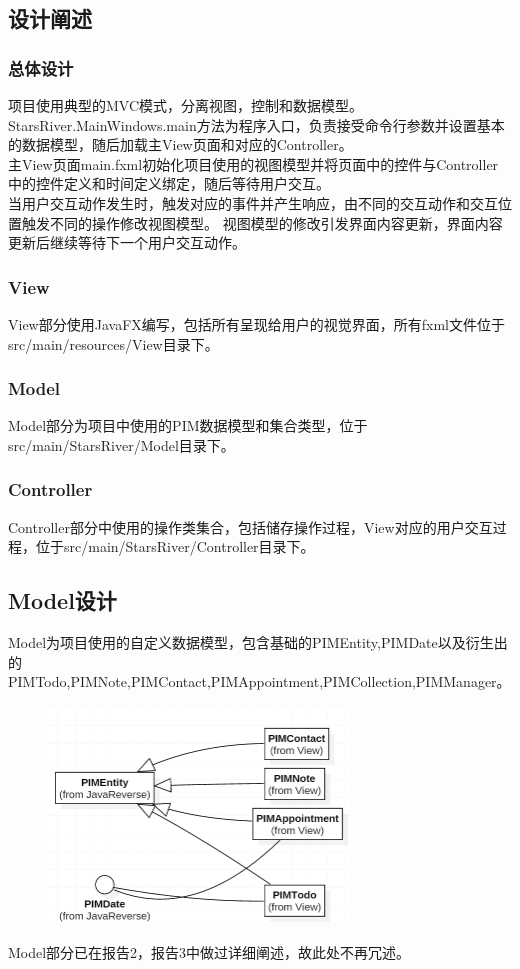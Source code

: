 \documentclass[a4paper]{article}
\begin{document}
\subsection{设计阐述}
    \subsubsection{总体设计}
        项目使用典型的MVC模式，分离视图，控制和数据模型。\\
        StarsRiver.MainWindows.main方法为程序入口，负责接受命令行参数并设置基本的数据模型，随后加载主View页面和对应的Controller。\\
        主View页面main.fxml初始化项目使用的视图模型并将页面中的控件与Controller中的控件定义和时间定义绑定，随后等待用户交互。\\
        当用户交互动作发生时，触发对应的事件并产生响应，由不同的交互动作和交互位置触发不同的操作修改视图模型。
        视图模型的修改引发界面内容更新，界面内容更新后继续等待下一个用户交互动作。
    \subsubsection{View}
        View部分使用JavaFX编写，包括所有呈现给用户的视觉界面，所有fxml文件位于src/main/resources/View目录下。\\
    \subsubsection{Model}
        Model部分为项目中使用的PIM数据模型和集合类型，位于src/main/StarsRiver/Model目录下。\\
    \subsubsection{Controller}
        Controller部分中使用的操作类集合，包括储存操作过程，View对应的用户交互过程，位于src/main/StarsRiver/Controller目录下。\\

\subsection{Model设计}
    Model为项目使用的自定义数据模型，包含基础的PIMEntity,PIMDate以及衍生出的PIMTodo,PIMNote,PIMContact,PIMAppointment,PIMCollection,PIMManager。\\
    
    \begin{figure}[h]
        \centering
        \includegraphics[width=8cm]{summe02r.PNG}\\
    \end{figure}
    Model部分已在报告2，报告3中做过详细阐述，故此处不再冗述。\\
\end{document}
